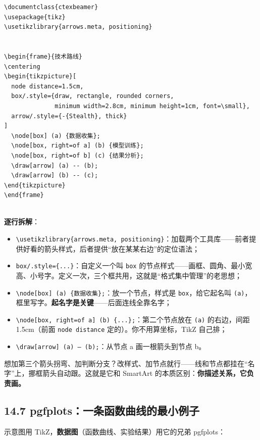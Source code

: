 \begin{lstlisting}
\documentclass{ctexbeamer}
\usepackage{tikz}
\usetikzlibrary{arrows.meta, positioning}


\begin{frame}{技术路线}
\centering
\begin{tikzpicture}[
  node distance=1.5cm,
  box/.style={draw, rectangle, rounded corners,
              minimum width=2.8cm, minimum height=1cm, font=\small},
  arrow/.style={-{Stealth}, thick}
]
  \node[box] (a) {数据收集};
  \node[box, right=of a] (b) {模型训练};
  \node[box, right=of b] (c) {结果分析};
  \draw[arrow] (a) -- (b);
  \draw[arrow] (b) -- (c);
\end{tikzpicture}
\end{frame}


\end{lstlisting}

\textbf{逐行拆解}：

\begin{itemize}
\setlength{\itemsep}{2pt}
\item \texttt{\textbackslash{}usetikzlibrary\{arrows.meta, positioning\}}：加载两个工具库——前者提供好看的箭头样式，后者提供“放在某某右边”的定位语法；
\item \texttt{box/.style=\{...\}}：自定义一个叫 \texttt{box} 的节点样式——画框、圆角、最小宽高、小号字。定义一次，三个框共用，这就是“格式集中管理”的老思想；
\item \texttt{\textbackslash{}node[box] (a) \{数据收集\};}：放一个节点，样式是 \texttt{box}，给它起名叫 \texttt{(a)}，框里写字。\textbf{起名字是关键}——后面连线全靠名字；
\item \texttt{\textbackslash{}node[box, right=of a] (b) \{...\};}：第二个节点放在 \texttt{(a)} 的右边，间距 1.5cm（前面 \texttt{node distance} 定的）。你不用算坐标，TikZ 自己排；
\item \texttt{\textbackslash{}draw[arrow] (a) -- (b);}：从节点 a 画一根箭头到节点 b。
\end{itemize}

想加第三个箭头拐弯、加判断分支？改样式、加节点就行——线和节点都挂在“名字”上，挪框箭头自动跟。这就是它和 SmartArt 的本质区别：\textbf{你描述关系，它负责画。}

\subsection*{14.7 pgfplots：一条函数曲线的最小例子}

示意图用 TikZ，\textbf{数据图}（函数曲线、实验结果）用它的兄弟 pgfplots：

